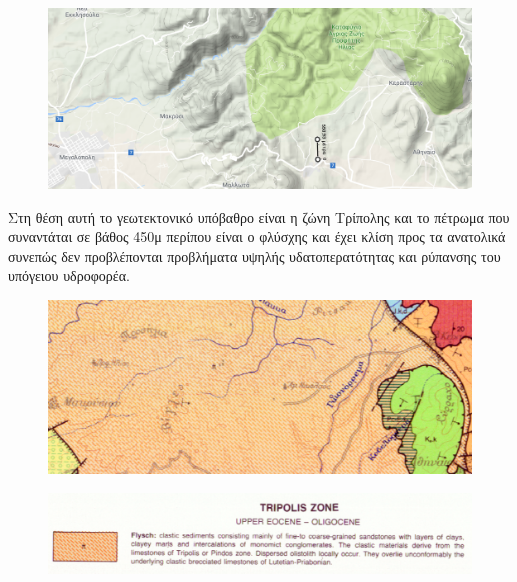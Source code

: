 \documentclass[12pt]{article}
\begin{document}
 	\begin{figure} [H]
 		\begin{center}
 			\includegraphics [scale = 0.30] {map36.png}
 		\end{center}
 	\end{figure}
 
 	Στη θέση αυτή το γεωτεκτονικό υπόβαθρο είναι η ζώνη Τρίπολης και το πέτρωμα που συναντάται σε βάθος 450μ περίπου είναι ο φλύσχης και έχει κλίση προς τα ανατολικά συνεπώς δεν προβλέπονται προβλήματα υψηλής υδατοπερατότητας και ρύπανσης του υπόγειου υδροφορέα.
 	
 	\begin{figure} [H]
 		\begin{center}
 			\includegraphics [scale = 0.30] {map37.png}
 		\end{center}
 	\end{figure}
 
 	\begin{figure} [H]
 		\begin{center}
 			\includegraphics [scale = 0.30] {explain4.png}
 		\end{center}
 	\end{figure}
 
\end{document}
